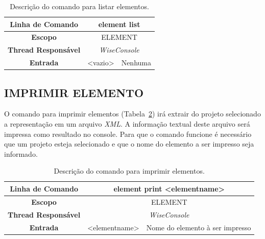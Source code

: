 \begin{center}
	\begin{table}[!htbp]
		\begin{tabularx}{\textwidth}{c|c|X}
			\toprule
			\textbf{Linha de Comando} & \multicolumn{2}{c}{element list} \\
			\midrule
			\textbf{Escopo} & \multicolumn{2}{c}{ELEMENT} \\
			\hline
			\textbf{Thread Responsável} & \multicolumn{2}{c}{\textit{WiseConsole}} \\
			\hline
			\textbf{Entrada} & <vazio> & Nenhuma \\
			\bottomrule
		\end{tabularx}
		\caption{Descrição do comando para listar elementos.}
		\label{tab:list_element}
	\end{table}
\end{center}

\subsection{IMPRIMIR ELEMENTO}\label{sec:print_element}

O comando para imprimir elementos (Tabela~\ref{tab:print_element}) irá extrair do projeto selecionado a representação em um arquivo \textit{XML}. A informação textual deste arquivo será impressa como resultado no console. Para que o comando funcione é necessário que um projeto esteja selecionado e que o nome do elemento a ser impresso seja informado.

\begin{center}
	\begin{table}[!htbp]
		\begin{tabularx}{\textwidth}{c|c|X}
			\toprule
			\textbf{Linha de Comando} & \multicolumn{2}{c}{element print <element\underline{\space\space}name>} \\
			\midrule
			\textbf{Escopo} & \multicolumn{2}{c}{ELEMENT} \\
			\hline
			\textbf{Thread Responsável} & \multicolumn{2}{c}{\textit{WiseConsole}} \\
			\hline
			\textbf{Entrada} & <element\underline{\space\space}name> & Nome do elemento à ser impresso \\
			\bottomrule
		\end{tabularx}
		\caption{Descrição do comando para imprimir elementos.}
		\label{tab:print_element}
	\end{table}
\end{center}


